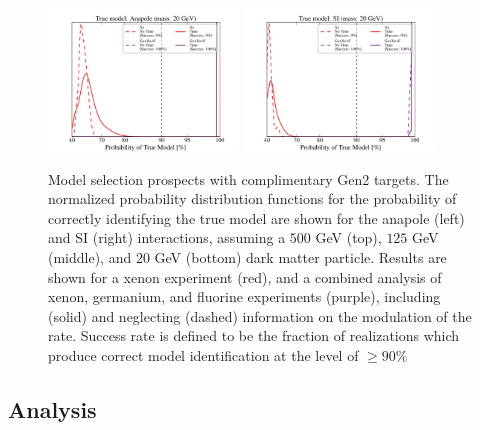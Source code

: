 \documentclass[11pt]{article}
\begin{document}
\begin{figure}
\includegraphics[width=0.45\textwidth]{plots/PDF_Single_20GeV_Anapole_50sims_Xe_vs_FGeXe_GF_TNT.pdf}
\includegraphics[width=0.45\textwidth]{plots/PDF_Single_20GeV_SI_Higgs_50sims_Xe_vs_FGeXe_GF_TNT.pdf}

\caption{\label{fig:gen2}
Model selection prospects with complimentary Gen2 targets. The normalized probability distribution functions for the probability of correctly identifying the true model are shown for the anapole (left) and SI (right) interactions, assuming a $500$ GeV (top), $125$ GeV (middle), and $20$ GeV (bottom) dark matter particle. Results are shown for a xenon experiment (red), and a combined analysis of xenon, germanium, and fluorine experiments (purple), including (solid) and neglecting (dashed) information on the modulation of the rate. Success rate is defined to be the fraction of realizations which produce correct model identification at the level of $ \geq 90\%$}
\end{figure}



\subsection{Analysis}
\end{document}
